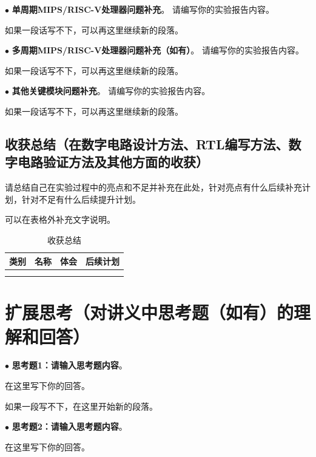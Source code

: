 \documentclass[11pt]{article}
\begin{document}
$\bullet$
\textbf{单周期MIPS/RISC-V处理器问题补充}。
请编写你的实验报告内容。

如果一段话写不下，可以再这里继续新的段落。

\vspace{1ex}

$\bullet$
\textbf{多周期MIPS/RISC-V处理器问题补充（如有）}。
请编写你的实验报告内容。

如果一段话写不下，可以再这里继续新的段落。

\vspace{1ex}

$\bullet$
\textbf{其他关键模块问题补充}。
请编写你的实验报告内容。

如果一段话写不下，可以再这里继续新的段落。

\subsection{收获总结（在数字电路设计方法、RTL编写方法、数字电路验证方法及其他方面的收获）}

请总结自己在实验过程中的亮点和不足并补充在此处，针对亮点有什么后续补充计划，针对不足有什么后续提升计划。

可以在表格外补充文字说明。

\begin{table}[h]
  \centering
  \begin{tabular}{c|c|c|c}
    类别 & 名称 & 体会 & 后续计划 \\
    \hline
       &    &    &      \\
    \hline
       &    &    &      \\
  \end{tabular}
  \caption{收获总结}
  \label{tab:placeholder}
\end{table}


\section{扩展思考（对讲义中思考题（如有）的理解和回答）}

\noindent
$\bullet$
\textbf{思考题1：请输入思考题内容}。

在这里写下你的回答。

如果一段写不下，在这里开始新的段落。


\vspace{1ex}

\noindent
$\bullet$
\textbf{思考题2：请输入思考题内容}。

在这里写下你的回答。
\end{document}
